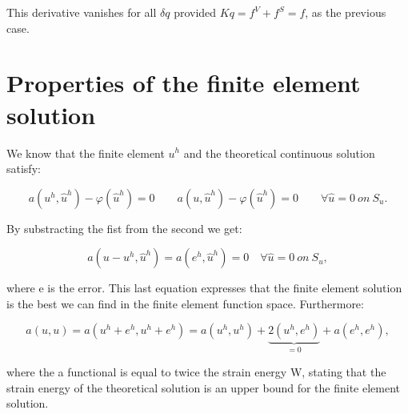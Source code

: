 	This derivative vanishes for all $\delta q$ provided $Kq = f^V + f^S =f$, as the previous case. 
	
\section{Properties of the finite element solution}
	We know that the finite element $u^h$ and the theoretical continuous solution satisfy: 
	
	\begin{equation}
	a(u^h, \hat{u}^h) - \varphi (\hat{u}^h) = 0 \qquad a(u, \hat{u}^h) - \varphi (\hat{u}^h) = 0 \qquad \forall \hat{u} = 0 \ on \ S_u.
	\end{equation}
	
	By substracting the fist from the second we get: 
	
	\begin{equation}
	a(u- u^h, \hat{u}^h) = a(e^h, \hat{u}^h) =  0\quad \forall \hat{u} = 0 \ on \ S_u,
	\end{equation}
	
	where e is the error. This last equation expresses that the finite element solution is the best we can find in the finite element function space. Furthermore:
	
	\begin{equation}
	a(u,u) = a(u^h + e^h, u^h +e^h) = a(u^h,u^h) + \underbrace{2(u^h, e^h)}_{=0 } + a(e^h, e^h),
	\end{equation}
	
	where the a functional is equal to twice the strain energy W, stating that the strain energy of the theoretical solution is an upper bound for the finite element solution. 
